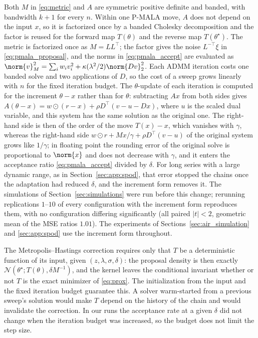 Both $M$ in \eqref{eq:metric} and $A$ are symmetric positive definite and banded, with bandwidth $k+1$ for every $n$. Within one P-MALA move, $A$ does not depend on the input $x$, so it is factorized once by a banded Cholesky decomposition and the factor is reused for the forward map $T(\theta)$ and the reverse map $T(\theta^\star)$. The metric is factorized once as $M = LL^\top$; the factor gives the noise $L^{-\top}\xi$ in \eqref{eq:pmala_proposal}, and the norms in \eqref{eq:pmala_accept} are evaluated as $\norm{v}_M^2 = \sum_i w_i v_i^2 + \kappa(\lambda^2/2)\norm{Dv}_2^2$. Each ADMM iteration costs one banded solve and two applications of $D$, so the cost of a sweep grows linearly with $n$ for the fixed iteration budget. The $\theta$-update of each iteration is computed for the increment $\theta - x$ rather than for $\theta$: subtracting $Ax$ from both sides gives $A(\theta - x) = w\odot(r - x) + \rho D^\top(v - u - Dx)$, where $u$ is the scaled dual variable, and this system has the same solution as the original one. The right-hand side is then of the order of the move $T(x) - x$, which vanishes with $\gamma$, whereas the right-hand side $w\odot r + Mx/\gamma + \rho D^\top(v - u)$ of the original system grows like $1/\gamma$; in floating point the rounding error of the original solve is proportional to $\norm{x}$ and does not decrease with $\gamma$, and it enters the acceptance ratio \eqref{eq:pmala_accept} divided by $\delta$. For long series with a large dynamic range, as in Section~\ref{sec:app:spod}, that error stopped the chains once the adaptation had reduced $\delta$, and the increment form removes it. The simulations of Section~\ref{sec:simulations} were run before this change; rerunning replications $1$--$10$ of every configuration with the increment form reproduces them, with no configuration differing significantly (all paired $|t| < 2$, geometric mean of the MSE ratios $1.01$). The experiments of Sections~\ref{sec:air_simulation} and \ref{sec:app:spod} use the increment form throughout.

The Metropolis--Hastings correction requires only that $T$ be a deterministic function of its input, given $(z, \lambda, \sigma, \delta)$: the proposal density is then exactly $\mathcal{N}(\theta^\star; T(\theta), \delta M^{-1})$, and the kernel leaves the conditional invariant whether or not $T$ is the exact minimizer of \eqref{eq:prox}. The initialization from the input and the fixed iteration budget guarantee this. A solver warm-started from a previous sweep's solution would make $T$ depend on the history of the chain and would invalidate the correction. In our runs the acceptance rate at a given $\delta$ did not change when the iteration budget was increased, so the budget does not limit the step size.

